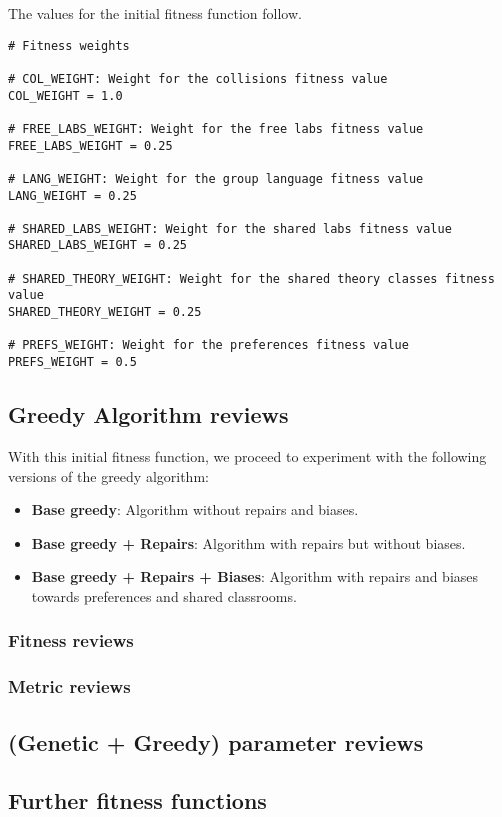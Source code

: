The values for the initial fitness function follow.

\begin{lstlisting}[basicstyle=\small]
# Fitness weights

# COL_WEIGHT: Weight for the collisions fitness value
COL_WEIGHT = 1.0

# FREE_LABS_WEIGHT: Weight for the free labs fitness value
FREE_LABS_WEIGHT = 0.25

# LANG_WEIGHT: Weight for the group language fitness value
LANG_WEIGHT = 0.25

# SHARED_LABS_WEIGHT: Weight for the shared labs fitness value
SHARED_LABS_WEIGHT = 0.25

# SHARED_THEORY_WEIGHT: Weight for the shared theory classes fitness value
SHARED_THEORY_WEIGHT = 0.25

# PREFS_WEIGHT: Weight for the preferences fitness value
PREFS_WEIGHT = 0.5
\end{lstlisting}



\subsection{Greedy Algorithm reviews}

With this initial fitness function, we proceed to experiment with the following versions of the greedy algorithm:

\begin{itemize}
    \item \textbf{Base greedy}: Algorithm without repairs and biases.
    \item \textbf{Base greedy + Repairs}: Algorithm with repairs but without biases.
    \item \textbf{Base greedy + Repairs + Biases}: Algorithm with repairs and biases towards preferences and shared classrooms.
\end{itemize}


\subsubsection{Fitness reviews}

\subsubsection{Metric reviews}


\subsection{(Genetic + Greedy) parameter reviews}

\subsection{Further fitness functions}

